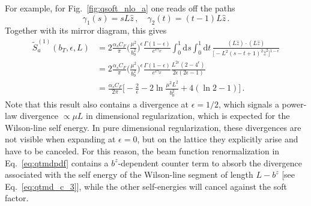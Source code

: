 \documentclass[11pt,a4paper]{article}
\DeclareRobustCommand{\eq}[1]{Eq.~\eqref{eq:#1}}
\DeclareRobustCommand{\fig}[1]{Fig.~\ref{fig:#1}}
\newcommand{\df}{\mathrm{d}}
\newcommand{\eps}{\epsilon}
\newcommand{\nn}{\nonumber}
\newcommand{\as}{\alpha_s}
\begin{document}
For example, for \fig{qsoft_nlo_a} one reads off the paths
\begin{equation}
 \gamma_1(s) = s L \hat z
\,,\quad
 \gamma_2(t) = (t - 1) L \hat z
\,.\end{equation}
Together with its mirror diagram, this gives
\begin{align} \label{eq:qsoft_nlo_a}
 \tilde S_a^{(1)}(b_T,\eps,L) &
 = 2 \frac{\as C_F}{\pi} \biggl(\frac{\mu^2}{b_0^2}\biggr)^\eps \frac{\Gamma(1-\eps)}{e^{\eps \gamma_E}}
   \int_0^1 \!\df s \int_0^1 \!\df t \, \frac{(L \hat z) \cdot (L \hat z)}{\bigl[- L^2 (s -t + 1)^2 \hat z^2 \bigr]^{1-\eps}}
\nn\\&
 = 2 \frac{\as C_F}{\pi} \biggl(\frac{\mu^2}{b_0^2}\biggr)^\eps \frac{\Gamma(1-\eps)}{e^{\eps \gamma_E}}
   \frac{ L^{2\eps} (2 - 4^\eps)}{2 \eps (2\eps - 1)}
\nn\\&
 = \frac{\as C_F}{2\pi} \biggl[ -\frac{2}{\eps} - 2 \ln\frac{\mu^2 L^2}{b_0^2} + 4(\ln2 - 1) \biggr]
\,.\end{align}
Note that this result also contains a divergence at $\eps=1/2$, which signals a power-law divergence $\propto \mu L$ in dimensional regularization, which is expected for the Wilson-line self energy.
In pure dimensional regularization, these divergences are not visible when expanding at $\eps=0$,
but on the lattice they explicitly arise and have to be canceled.
For this reason, the beam function renormalization in \eq{qtmdpdf} contains a $b^z$-dependent counter term to absorb the divergence associated with the self energy of the Wilson-line segment of length $L-b^z$ [see \eq{qtmd_c_3}],
while the other self-energies will cancel against the soft factor.
\end{document}
